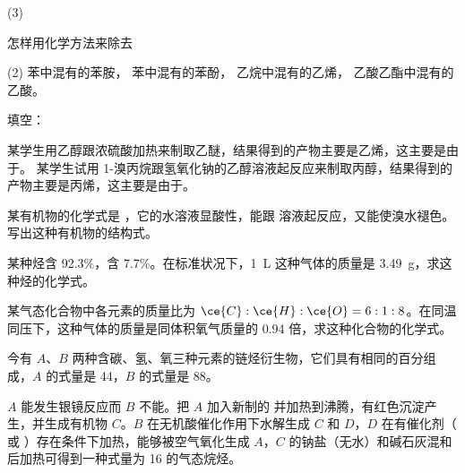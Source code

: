 \begin{Exercise}
\begin{question}
  \begin{tasks}[label=\Alph*.](3)
    \task {}
    \task {}
    \task {}
    \task {}
    \task {}
    \task {}
    \task {}
    \task {}
  \end{tasks}
  \item 怎样用化学方法来除去
  \begin{tasks}(2)
    \task 苯中混有的苯胺，
    \task 苯中混有的苯酚，
    \task 乙烷中混有的乙烯，
    \task 乙酸乙酯中混有的乙酸。
  \end{tasks}
  \item 填空：
  \begin{tasks}
    \task 某学生用乙醇跟浓硫酸加热来制取乙醚，结果得到的产物主要是乙烯，这主要是由于。
    \task 某学生试用 1-溴丙烷跟氢氧化钠的乙醇溶液起反应来制取丙醇，结果得到的产物主要是丙烯，这主要是由于。
  \end{tasks}
  \item 某有机物的化学式是 ，它的水溶液显酸性，能跟  溶液起反应，又能使溴水褪色。写出这种有机物的结构式。
  \item 某种烃含  92.3\%，含  7.7\%。在标准状况下，\qty{1}{L} 这种气体的质量是 \qty{3.49}{g}，求这种烃的化学式。
  \item 某气态化合物中各元素的质量比为 $\ce{C}:\ce{H}:\ce{O}=6:1:8$。在同温同压下，这种气体的质量是同体积氧气质量的 0.94 倍，求这种化合物的化学式。
  \item 今有 $A$、$B$ 两种含碳、氢、氧三种元素的链烃衍生物，它们具有相同的百分组成，$A$ 的式量是 44，$B$ 的式量是 88。
  
  $A$ 能发生银镜反应而 $B$ 不能。把 $A$ 加入新制的  并加热到沸腾，有红色沉淀产生，并生成有机物 $C$。$B$ 在无机酸催化作用下水解生成 $C$ 和 $D$，$D$ 在有催化剂（ 或 ）存在条件下加热，能够被空气氧化生成 $A$，$C$ 的钠盐（无水）和碱石灰混和后加热可得到一种式量为 16 的气态烷烃。


\end{question}
\end{Exercise}
